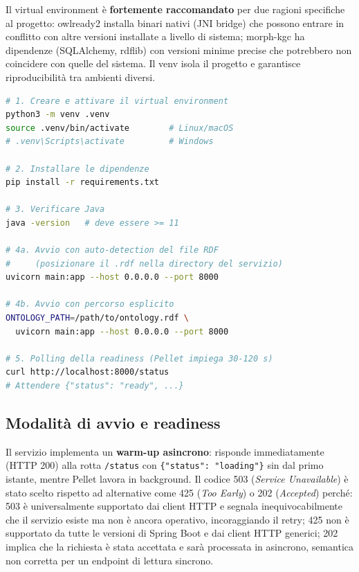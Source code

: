 \documentclass[a4paper,12pt]{article}
\begin{document}
Il virtual environment \`{e} \textbf{fortemente raccomandato} per due ragioni
specifiche al progetto: owlready2 installa binari nativi (JNI bridge) che
possono entrare in conflitto con altre versioni installate a livello di sistema;
morph-kgc ha dipendenze (SQLAlchemy, rdflib) con versioni minime precise che
potrebbero non coincidere con quelle del sistema. Il venv isola il progetto
e garantisce riproducibilit\`{a} tra ambienti diversi.

\begin{lstlisting}[language=bash, caption={Setup completo dell'ambiente di sviluppo.}]
# 1. Creare e attivare il virtual environment
python3 -m venv .venv
source .venv/bin/activate        # Linux/macOS
# .venv\Scripts\activate         # Windows

# 2. Installare le dipendenze
pip install -r requirements.txt

# 3. Verificare Java
java -version   # deve essere >= 11

# 4a. Avvio con auto-detection del file RDF
#     (posizionare il .rdf nella directory del servizio)
uvicorn main:app --host 0.0.0.0 --port 8000

# 4b. Avvio con percorso esplicito
ONTOLOGY_PATH=/path/to/ontology.rdf \
  uvicorn main:app --host 0.0.0.0 --port 8000

# 5. Polling della readiness (Pellet impiega 30-120 s)
curl http://localhost:8000/status
# Attendere {"status": "ready", ...}
\end{lstlisting}

\noindent \subsection{Modalit\`{a} di avvio e readiness}

Il servizio implementa un \textbf{warm-up asincrono}: risponde
immediatamente (HTTP 200) alla rotta \texttt{/status} con
\texttt{\{"status": "loading"\}} sin dal primo istante, mentre Pellet
lavora in background. Il codice 503 (\textit{Service Unavailable}) \`{e}
stato scelto rispetto ad alternative come 425 (\textit{Too Early}) o 202
(\textit{Accepted}) perch\'{e}: 503 \`{e} universalmente supportato dai
client HTTP e segnala inequivocabilmente che il servizio esiste ma non
\`{e} ancora operativo, incoraggiando il retry; 425 non \`{e} supportato
da tutte le versioni di Spring Boot e dai client HTTP generici; 202 implica
che la richiesta \`{e} stata accettata e sar\`{a} processata in asincrono,
semantica non corretta per un endpoint di lettura sincrono.
\end{document}
